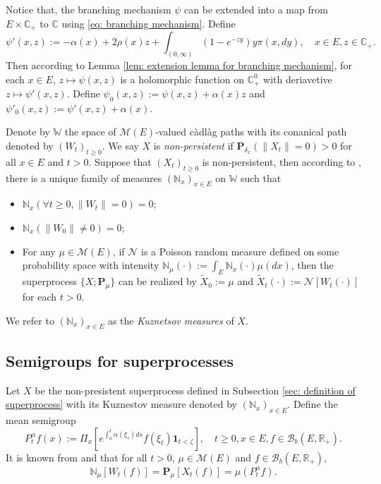 \documentclass[12pt,a4paper]{amsart}
\theoremstyle{plain}
\theoremstyle{definition}
\numberwithin{equation}{section}
\begin{document}
    Notice that, the branching mechanism $\psi$ can be extended into a map from $E \times \mathbb C_+$ to $\mathbb C$ using \eqref{eq: branching mechanism}.
    Define
\begin{equation}
    \psi'(x,z):= - \alpha(x) + 2\rho(x) z + \int_{(0,\infty)} (1-e^{-zy})y\pi(x,dy),
    \quad x\in E, z\in \mathbb C_+.
\end{equation}
    Then according to Lemma \ref{lem: extension lemma for branching mechanism}, for each $x \in E$, $z \mapsto \psi(x,z)$ is a holomorphic function on $\mathbb C_+^0$ with deriavetive $z \mapsto \psi'(x,z)$.
    Define $\psi_0(x,z) := \psi(x,z)+ \alpha(x)z $ and $\psi'_0(x,z) := \psi'(x,z) + \alpha(x)$.

    Denote by $\mathbb W$ the space of $\mathcal M(E)$-valued c\`{a}dl\`{a}g paths with its conanical path denoted by $(W_t)_{t\geq 0}$.
    We say $X$ is \emph{non-persistent} if $\mathbf P_{\delta_x}(\|X_t\|= 0) > 0$ for all $x\in E$ and $t> 0$.
    Suppose that $(X_t)_{t\geq 0}$ is non-persistent, then according to \cite[Section 8.4]{Li2011Measure-valued},
    there is a unique family of measures $(\mathbb N_x)_{x\in E}$ on $\mathbb W$ such that
\begin{itemize}
\item
    $\mathbb N_x (\forall t \geq 0, \|W_t\|=0) =0$;
\item
    $\mathbb N_x(\|W_0 \|\neq 0) = 0$;
\item
    For any $\mu \in \mathcal M(E)$, if $\mathcal N$ is a Poisson random measure defined on some probability space
    with intensity $\mathbb N_\mu(\cdot):= \int_E \mathbb N_x(\cdot )\mu(dx)$,
    then the superprocess $\{X;\mathbf P_\mu\}$ can be realized by $\widetilde X_0 := \mu$ and $\widetilde X_t(\cdot) := \mathcal N[W_t(\cdot)]$ for each $t>0$.
\end{itemize}
    We refer to $(\mathbb N_x)_{x\in E}$ as the \emph{Kuznetsov measures} of $X$.
\subsection{{Semigroups for superprocesses}}
\label{sec: definition of vf}
    Let $X$ be the non-presistent superprocess defined in Subsection \ref{sec: definition of superprocess} with its Kuznestov measure denoted by $(\mathbb N_x)_{x\in E}$.
    Define the mean semigroup
\begin{equation}
   P_t^\alpha f(x)
    := \Pi_{x}[e^{\int_0^t \alpha(\xi_s)ds}f(\xi_t) \mathbf 1_{t< \zeta}],
    \quad t\geq 0, x\in E, f\in \mathcal B_b(E,\mathbb R_+).
\end{equation}
    It is known from \cite[Proposition 2.27]{Li2011Measure-valued} and \cite[Theorem 2.7]{Kyprianou2014Fluctuations} that for all $t > 0$, $\mu \in \mathcal M(E)$ and $f\in \mathcal B_b(E,\mathbb R_+)$,
\begin{equation}
\label{eq: mean formula for superprocesses}
    \mathbb N_{\mu}[W_t(f)]
    =\mathbf P_{\mu}[X_t(f)]=
    \mu(P^\alpha_t f).
\end{equation}
\end{document}
